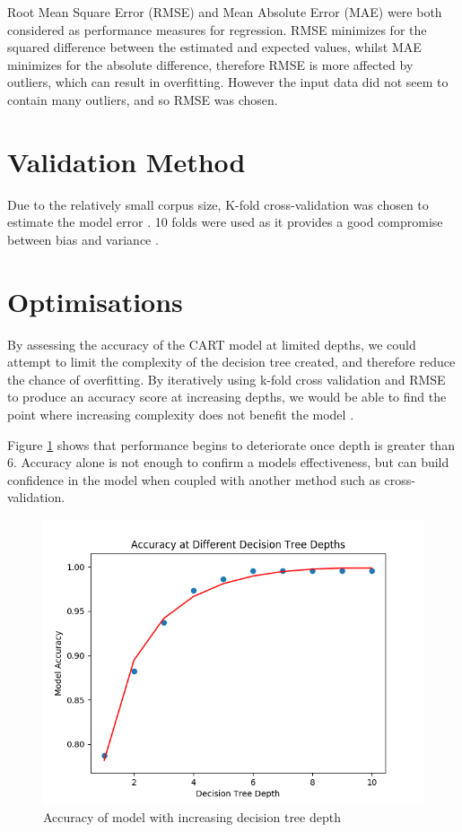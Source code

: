 \documentclass[12pt]{article}
\begin{document}
Root Mean Square Error (RMSE) and Mean Absolute Error (MAE) were both considered as performance measures for regression. RMSE minimizes for the squared difference between the estimated and expected values, whilst MAE minimizes for the absolute difference, therefore RMSE is more affected by outliers, which can result in overfitting. However the input data did not seem to contain many outliers, and so RMSE was chosen.

\section{Validation Method}

Due to the relatively small corpus size, K-fold cross-validation was chosen to estimate the model error \cite{gron_2018}. 10 folds were used as it provides a good compromise between bias and variance \cite{hastie01statisticallearning}.

\section{Optimisations}

By assessing the accuracy of the CART model at limited depths, we could attempt to limit the complexity of the decision tree created, and therefore reduce the chance of overfitting. By iteratively using k-fold cross validation and RMSE to produce an accuracy score at increasing depths, we would be able to find the point where increasing complexity does not benefit the model \cite{massaron_mueller_2015}. 

Figure \ref{fig:depth} shows that performance begins to deteriorate once depth is greater than 6. Accuracy alone is not enough to confirm a models effectiveness, but can build confidence in the model when coupled with another method such as cross-validation.

\begin{figure}[!ht]
\centering
\includegraphics[width=0.8 \linewidth]{images/depth}
\caption{Accuracy of model with increasing decision tree depth}
\label{fig:depth}
\end{figure}
\end{document}

